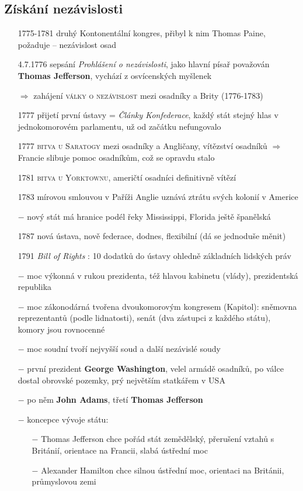 \documentclass{article}
\begin{document}
  \subsection*{Získání nezávislosti}
  \begin{itemize}
      \vspace{-0.5em}
      \setlength\itemsep{0.15em}
    \item[1775-1781] druhý Kontonentální kongres, přibyl k nim Thomas Paine, požaduje  -- nezávislost osad
    \item[4.7.1776] sepsání \textit{Prohlášení o nezávislosti}, jako hlavní písař považován \textbf{Thomas Jefferson}, vychází z osvícenských myšlenek
    \item[$\Rightarrow$] zahájení \textsc{války o nezávislost} mezi osadníky a Brity (1776-1783)
    \item[1777] přijetí první ústavy = \textit{Články Konfederace}, každý stát stejný hlas v jednokomorovém parlamentu, už od začátku nefungovalo
    \item[1777] \textsc{bitva u Saratogy} mezi osadníky a Angličany, vítězství osadníků $\Rightarrow$  Francie slibuje pomoc osadníkům, což se opravdu stalo
    \item[1781] \textsc{bitva u Yorktownu}, američtí osadníci definitivně vítězí
    \item[1783] mírovou smlouvou v Paříži Anglie uznává ztrátu svých kolonií v Americe
    \item[$-$] nový stát má hranice podél řeky Mississippi, Florida ještě španělská
    \item[1787] nová ústava, nově federace, dodnes, flexibilní (dá se jednoduše měnit)
    \item[1791] \textit{Bill of Rights} : 10 dodatků do ústavy ohledně základních lidských práv
    \item[$-$] moc výkonná v rukou prezidenta, též hlavou kabinetu (vlády), prezidentská republika
    \item[$-$] moc zákonodárná tvořena dvoukomorovým kongresem (Kapitol): sněmovna reprezentantů (podle lidnatosti), senát (dva zástupci z každého státu), komory jsou rovnocenné
    \item[$-$] moc soudní tvoří nejvyšší soud a další nezávislé soudy
    \item[$-$] první prezident \textbf{George Washington}, velel armádě osadníků, po válce dostal obrovské pozemky, prý největším statkářem v USA
    \item[$-$] po něm \textbf{John Adams}, třetí \textbf{Thomas Jefferson}
    \item[$-$] koncepce vývoje státu:
    \begin{itemize}
        \vspace{-0.5em}
        \setlength\itemsep{0.15em}
        \item[$-$] Thomas Jefferson chce pořád stát zemědělský, přerušení vztahů s Británií, orientace na Francii, slabá ústřední moc
        \item[$-$] Alexander Hamilton chce silnou ústřední moc, orientaci na Británii, průmyslovou zemi
    \end{itemize}

\end{itemize}
\end{document}
